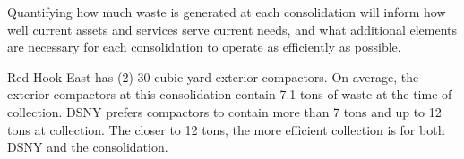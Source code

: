 
    Quantifying how much waste is generated at each consolidation will inform how well current assets and services serve current needs, and what additional elements are necessary for each consolidation to operate as efficiently as possible.
    
    Red Hook East has (2) 30-cubic yard exterior compactors. On average, the exterior compactors at this consolidation contain 7.1 tons of waste at the time of collection. DSNY prefers compactors to contain more than 7 tons and up to 12 tons at collection. The closer to 12 tons, the more efficient collection is for both DSNY and the consolidation.